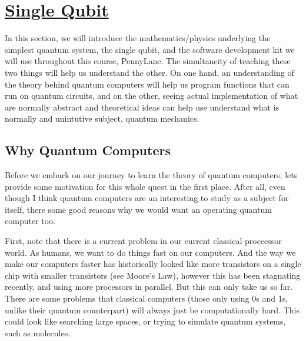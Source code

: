 \section[Single Qubit]{\hyperlink{toc}{Single Qubit}}

In this section,
we will introduce the mathematics/physics underlying the simplest quantum system, the single qubit,
and the software development kit we will use throughout this course, PennyLane.
The simultaneity of teaching these two things will help us understand the other.
On one hand, an understanding of the theory behind quantum computers
will help us program functions that can run on quantum circuits,
and on the other,
seeing actual implementation of what are normally abstract and theoretical ideas
can help use understand what is normally and unintutive subject, quantum mechanics.

\subsection{Why Quantum Computers}

Before we embark on our journey to learn the theory of quantum computers,
lets provide some motivation for this whole quest in the first place.
After all, even though I think quantum computers are an interesting to study
as a subject for itself,
there some good reasons why we would want an operating quantum computer too.

First, note that there is a current problem in our current classical-proccessor world.
As humans, we want to do things fast on our computers.
And the way we make our computers faster has historically looked like
more transistors on a single chip with smaller transistors (see Moore's Law),
however this has been stagnating recently,
and using more processors in parallel.
But this can only take us so far.
There are some problems that classical computers
(those only using 0s and 1s, unlike their quantum counterpart)
will always just be computationally hard.
This could look like searching large spaces,
or trying to simulate quantum systems, such as molecules.

